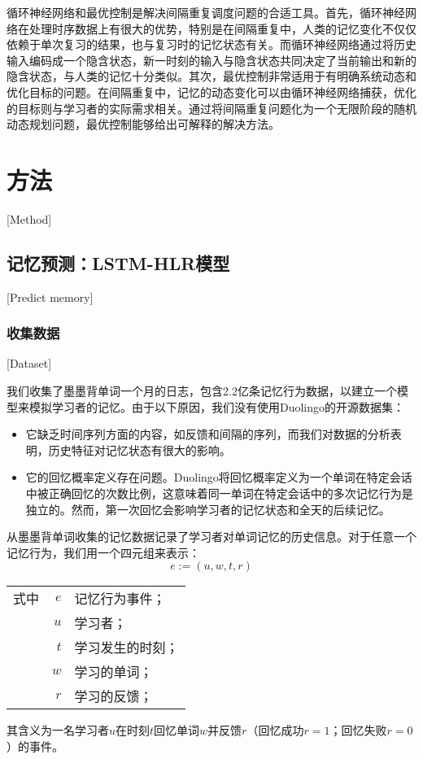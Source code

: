 循环神经网络和最优控制是解决间隔重复调度问题的合适工具。首先，循环神经网络在处理时序数据上有很大的优势，特别是在间隔重复中，人类的记忆变化不仅仅依赖于单次复习的结果，也与复习时的记忆状态有关。而循环神经网络通过将历史输入编码成一个隐含状态，新一时刻的输入与隐含状态共同决定了当前输出和新的隐含状态，与人类的记忆十分类似。其次，最优控制非常适用于有明确系统动态和优化目标的问题。在间隔重复中，记忆的动态变化可以由循环神经网络捕获，优化的目标则与学习者的实际需求相关。通过将间隔重复问题化为一个无限阶段的随机动态规划问题，最优控制能够给出可解释的解决方法。

\chapter{方法}[Method]

\section{记忆预测：LSTM-HLR模型}[Predict memory]

\subsection{收集数据}[Dataset]

我们收集了墨墨背单词一个月的日志，包含2.2亿条记忆行为数据，以建立一个模型来模拟学习者的记忆。由于以下原因，我们没有使用Duolingo的开源数据集：

\begin{itemize}
    \item 它缺乏时间序列方面的内容，如反馈和间隔的序列，而我们对数据的分析表明，历史特征对记忆状态有很大的影响。
    \item 它的回忆概率定义存在问题。Duolingo将回忆概率定义为一个单词在特定会话中被正确回忆的次数比例，这意味着同一单词在特定会话中的多次记忆行为是独立的。然而，第一次回忆会影响学习者的记忆状态和全天的后续记忆。
\end{itemize}

从墨墨背单词收集的记忆数据记录了学习者对单词记忆的历史信息。对于任意一个记忆行为，我们用一个四元组来表示：
\begin{equation}
e :=(u, w, t, r)
\end{equation}
\begin{tabularx}{\textwidth}{@{}l@{\quad}r@{———}X@{}}
    式中& $e$ &记忆行为事件；\\
    &  $u$ &学习者；\\
    &  $t$ &学习发生的时刻；\\
    &  $w$ &学习的单词；\\
    &  $r$ &学习的反馈；
\end{tabularx}\vspace{3.15bp}
其含义为一名学习者$u$在时刻$t$回忆单词$w$并反馈$r$（回忆成功$r=1$；回忆失败$r=0$）的事件。

